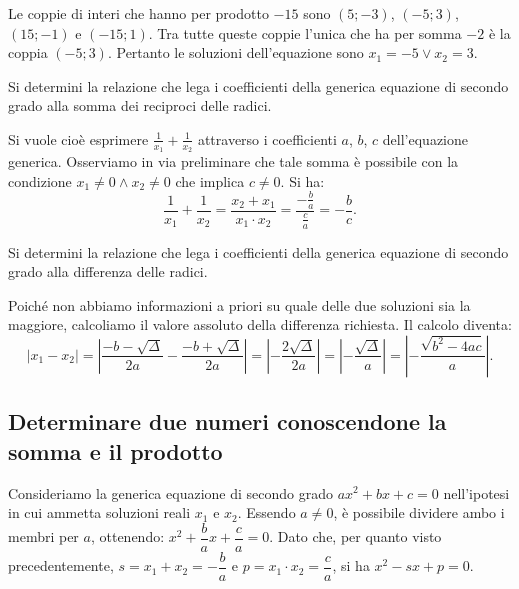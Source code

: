 \begin{exrig}
\begin{esempio}
Le coppie di interi che hanno per prodotto $-15$ sono $(5;-3)$, $(-5;3)$, $(15;-1)$ e $(-15;1)$. Tra tutte queste coppie l'unica che ha per somma $-2$ è la coppia $(-5;3)$.
Pertanto le soluzioni dell'equazione sono $x_{1} = -5 \vee x_{2} = 3$.
\end{esempio}

\begin{esempio}
Si determini la relazione che lega i coefficienti della generica equazione di secondo grado alla somma dei reciproci delle radici.

Si vuole cioè esprimere $\frac{1}{x_{1}} + \frac{1}{x_{2}}$ attraverso i coefficienti $a$, $b$, $c$ dell'equazione generica. Osserviamo in via preliminare che tale somma è possibile con la condizione $x_{1} \neq 0 \wedge x_{2} \neq 0$ che implica $c \neq 0$. Si ha: 
\[\frac{1}{x_{1}} + \frac{1}{x_{2}} = \frac{x_{2} + x_{1}}{x
_{1} \cdot x_{2}} = \frac{- \frac{b}{a}}{\frac{c}{a}} = - \frac{b}{c}.\]
\end{esempio}

\begin{esempio}
Si determini la relazione che lega i coefficienti della generica equazione di secondo grado alla differenza delle radici.

Poiché non abbiamo informazioni a priori su quale delle due soluzioni sia la maggiore, calcoliamo il valore assoluto della differenza richiesta. Il calcolo diventa: \[
\left\lvert x_{1} - x_{2} \right\rvert = \left\lvert \frac{- b -\sqrt{\Delta}}{2 a} - \frac{- b + \sqrt{\Delta}}{2 a} \right\rvert =\left\lvert - \frac{2 \sqrt{\Delta}}{2 a} \right\rvert = \left\lvert -\frac{\sqrt{\Delta}}{a} \right\rvert = \left\lvert -\frac{\sqrt{b^2-4ac}}{a} \right\rvert.
\]
\end{esempio}
\end{exrig}
\vspazio\ovalbox{\risolvii \ref{ese:3.78}, \ref{ese:3.78}, \ref{ese:3.80}, \ref{ese:3.81}, \ref{ese:3.82}, \ref{ese:3.83}, \ref{ese:3.84}, \ref{ese:3.85}, \ref{ese:3.86}, \ref{ese:3.87}, \ref{ese:3.88}, \ref{ese:3.89}, \ref{ese:3.90}, }

\subsection{Determinare due numeri conoscendone la somma e il prodotto}

Consideriamo la generica equazione di secondo grado $a x^{2} + bx + c = 0$ nell'ipotesi in cui ammetta soluzioni reali $x_{1}$ e $x_{2}$. Essendo $a \neq 0$, è possibile dividere ambo i membri per $a$, ottenendo: $x^{2} + \dfrac{b}{a} x + \dfrac{c}{a} = 0$. Dato che, per quanto visto precedentemente, $s = x_{1} + x_{2} = - \dfrac{b}{a}$ e $p = x_{1} \cdot x_{2} = \dfrac{c}{a}$, si ha $x^{2} - s x + p = 0$.

